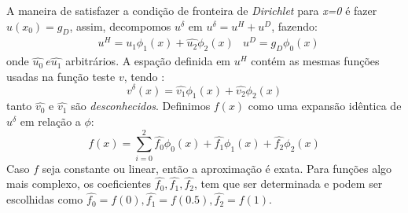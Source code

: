  A maneira de satisfazer a condição de fronteira de \emph{Dirichlet} para \emph{x=0} é fazer $u(x_0) = g_D$, assim, decompomos $u^\delta$ em $u^\delta = u^H + u^D$, fazendo:
 \begin{align}
 & u^H = \hat{u_1}\phi_1(x) + \hat{u_2}\phi_2(x)
 & u^D = g_D\phi_0(x)
 \end{align}
 onde $\hat{u_0}\ e \hat{u_1}$ arbitrários. A espação definida em $u^H$ contém as mesmas funções usadas na função teste $v$, tendo :
 \begin{equation}
 v^\delta(x) = \hat{v_1}\phi_1(x) + \hat{v_2}\phi_2(x)
 \end{equation}
 tanto $\hat{v_0}$ e $\hat{v_1}$ são \emph{desconhecidos}. Definimos $f(x)$ como uma expansão idêntica de $u^\delta$ em relação a $\phi$:
 \begin{equation}
 f(x) = \sum^2_{i=0} \hat{f_0}\phi_0(x) +\hat{f_1}\phi_1(x) + \hat{f_2}\phi_2(x)
 \end{equation}
 Caso $f$ seja constante ou linear, então a aproximação é exata. Para funções algo mais complexo, os coeficientes $\hat{f_0},\hat{f_1},\hat{f_2}$, tem que ser determinada e podem ser escolhidas como  $\hat{f_0} = f(0),\hat{f_1} = f(0.5),\hat{f_2} = f(1)$.

